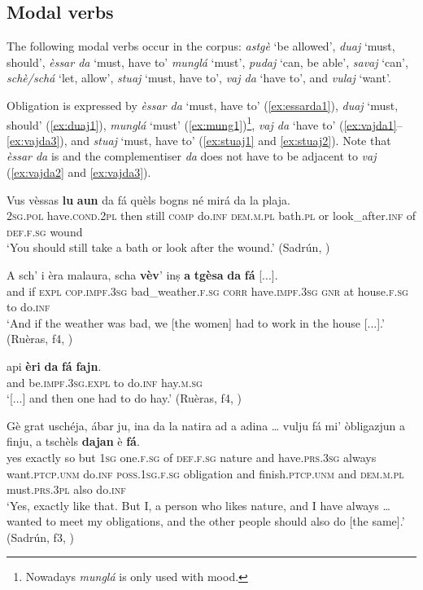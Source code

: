 \subsection{Modal verbs}\label{sec:4.1.6}
The following modal verbs occur in the corpus: \textit{astgè} `be allowed', \textit{duaj} `must, should', \textit{èssar da} `must, have to' \textit{munglá} `must', \textit{pudaj} `can, be able', \textit{savaj} `can', \textit{schè/schá} `let, allow', \textit{stuaj} `must, have to', \textit{vaj da} `have to', and \textit{vulaj} `want'.

Obligation is expressed by \textit{èssar da} `must, have to' (\ref{ex:essarda1}), \textit{duaj} `must, should' (\ref{ex:duaj1}), \textit{munglá} `must' (\ref{ex:mung1})\footnote{Nowadays \textit{munglá} is only used with  mood.}, \textit{vaj da} `have to' (\ref{ex:vajda1}--\ref{ex:vajda3}), and \textit{stuaj} `must, have to' (\ref{ex:stuaj1} and \ref{ex:stuaj2}). Note that \textit{èssar da} is  and the complementiser \textit{da} does not have to be adjacent to \textit{vaj} (\ref{ex:vajda2} and \ref{ex:vajda3}). 

\ea
\label{ex:vajda2}
\gll  Vus vèssas \textbf{lu} \textbf{aun} da fá quèls bogns né mirá da la plaja.\\
\textsc{2sg.pol}  have.\textsc{cond.2pl} then still \textsc{comp} do.\textsc{inf} \textsc{dem.m.pl} bath.\textsc{pl} or look\_after.\textsc{inf} of \textsc{def.f.sg} wound\\
\glt `You should still take a bath or look after the wound.' (Sadrún, )
\z

\ea
\label{ex:vajda3}
\gll A sch’ i èra malaura, scha \textbf{vèv}’ inṣ \textbf{a} \textbf{tgèsa} \textbf{da} \textbf{fá} [...].\\
and if \textsc{expl} \textsc{cop.impf.3sg} bad\_weather.\textsc{f.sg} \textsc{corr} have.\textsc{impf.3sg} \textsc{gnr} at house.\textsc{f.sg} to do.\textsc{inf} \\
\glt `And if the weather was bad, we [the women] had to work in the house [...].' (Ruèras, f4, )
\z

\ea
\label{ex:essarda1}
	\gll [...] api \textbf{èri} \textbf{da} \textbf{fá} \textbf{fajn}.\\
{} and be.\textsc{impf.3sg.expl} to do.\textsc{inf} hay.\textsc{m.sg}\\
\glt `[...] and then one had to do hay.' (Ruèras, f4, )
\z

\ea
\label{ex:duaj1}
\gll Gè grat uschéja, ábar ju, ina da la natira ad a adina … vulju fá mi' òbligazjun a finju, a tschèls \textbf{dajan} è \textbf{fá}.\\
yes exactly so but \textsc{1sg} one.\textsc{f.sg} of \textsc{def.f.sg} nature and have.\textsc{prs.3sg} always {} want.\textsc{ptcp.unm} do.\textsc{inf} \textsc{poss.1sg.f.sg} obligation and finish.\textsc{ptcp.unm} and \textsc{dem.m.pl} must.\textsc{prs.3pl} also do.\textsc{inf}\\
\glt `Yes, exactly like that. But I, a person who likes nature, and I have always … wanted to meet my obligations, and the other people should also do [the same].' (Sadrún, f3, )
\z

